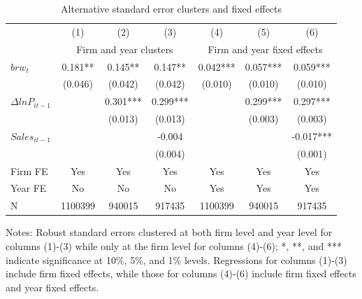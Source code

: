 \begin{table}[htbp]
    \centering
    \caption{Alternative standard error clusters and fixed effects}
    \begin{threeparttable}
    \begin{tabular}{lcccccc}
        \toprule
        & (1)   & (2)   & (3)   & (4)   & (5)   & (6) \\
        & \multicolumn{3}{c}{Firm and year clusters} & \multicolumn{3}{c}{Firm and year fixed effects}  \\
        \midrule
        $brw_t$   & 0.181** & 0.145** & 0.147** & 0.042*** & 0.057*** & 0.059*** \\
              & (0.046) & (0.042) & (0.042) & (0.010) & (0.010) & (0.010) \\
        $\Delta ln P_{it-1}$ &       & 0.301*** & 0.299*** &       & 0.299*** & 0.297*** \\
              &       & (0.013) & (0.013) &       & (0.003) & (0.003) \\
        $Sales_{it-1}$ &       &       & -0.004 &       &       & -0.017*** \\
              &       &       & (0.004) &       &       & (0.001) \\
        \midrule
        Firm FE & Yes   & Yes   & Yes   & Yes   & Yes   & Yes \\
        Year FE & No    & No    & No    & Yes   & Yes   & Yes \\
        N     & 1100399 & 940015 & 917435 & 1100399 & 940015 & 917435 \\
        \bottomrule
    \end{tabular}
        \begin{tablenotes}
            \footnotesize
            \item Notes: Robust standard errors clustered at both firm level and year level for columns (1)-(3) while only at the firm level for columns (4)-(6);  *, **, and *** indicate significance at 10\%, 5\%, and 1\% levels. Regressions for columns (1)-(3) include firm fixed effects, while those for columns (4)-(6) include firm fixed effects and year fixed effects.
	\end{tablenotes}
    \end{threeparttable}
    \label{tab.altfe}
\end{table}


